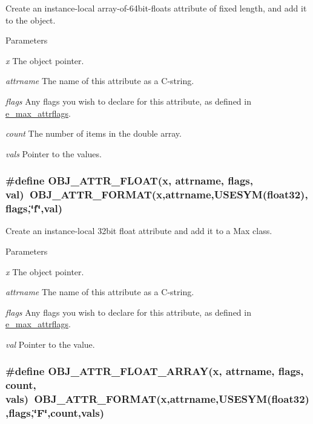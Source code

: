 Create an instance-\/local array-\/of-\/64bit-\/floats attribute of fixed length, and add it to the object. 
\begin{DoxyParams}{Parameters}
\item[{\em x}]The object pointer. \item[{\em attrname}]The name of this attribute as a C-\/string. \item[{\em flags}]Any flags you wish to declare for this attribute, as defined in \hyperlink{group__attr_gaf296cfc6741bb19207f6ed8062809115}{e\_\-max\_\-attrflags}. \item[{\em count}]The number of items in the double array. \item[{\em vals}]Pointer to the values. \end{DoxyParams}
\hypertarget{group__attr_gab84f72b59c20bf72160482005359dd86}{
\subsubsection[{OBJ\_\-ATTR\_\-FLOAT}]{\setlength{\rightskip}{0pt plus 5cm}\#define OBJ\_\-ATTR\_\-FLOAT(x, \/  attrname, \/  flags, \/  val)~OBJ\_\-ATTR\_\-FORMAT(x,attrname,USESYM(float32),flags,\char`\"{}f\char`\"{},val)}}
\label{group__attr_gab84f72b59c20bf72160482005359dd86}


Create an instance-\/local 32bit float attribute and add it to a Max class. 
\begin{DoxyParams}{Parameters}
\item[{\em x}]The object pointer. \item[{\em attrname}]The name of this attribute as a C-\/string. \item[{\em flags}]Any flags you wish to declare for this attribute, as defined in \hyperlink{group__attr_gaf296cfc6741bb19207f6ed8062809115}{e\_\-max\_\-attrflags}. \item[{\em val}]Pointer to the value. \end{DoxyParams}
\hypertarget{group__attr_gacc0e80be311a6716c6054da87fecd568}{
\subsubsection[{OBJ\_\-ATTR\_\-FLOAT\_\-ARRAY}]{\setlength{\rightskip}{0pt plus 5cm}\#define OBJ\_\-ATTR\_\-FLOAT\_\-ARRAY(x, \/  attrname, \/  flags, \/  count, \/  vals)~OBJ\_\-ATTR\_\-FORMAT(x,attrname,USESYM(float32),flags,\char`\"{}F\char`\"{},count,vals)}}
\label{group__attr_gacc0e80be311a6716c6054da87fecd568}


